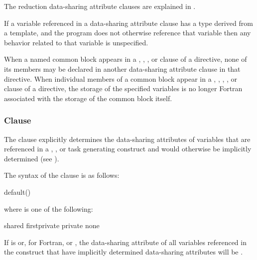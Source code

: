 The reduction data-sharing attribute clauses are explained in 
.

\begin{cppspecific}
If a variable referenced in a data-sharing attribute clause has a type derived from a
template, and the program does not otherwise reference that variable then any
behavior related to that variable is unspecified.
\end{cppspecific}

\begin{fortranspecific}
When a named common block appears in a , ,
, or  clause of a directive, none of its members 
may be declared in another data-sharing attribute clause in that directive. When 
individual members of a common block appear in a , ,
, , or  clause of a directive, the 
storage of the specified variables is no longer Fortran associated with the storage 
of the common block itself. 
\end{fortranspecific}



\subsubsection{ Clause}
\label{subsubsec:default clause}
\summary
The  clause explicitly determines the data-sharing attributes 
of variables that are referenced in a , , or task 
generating construct and would otherwise be implicitly determined (see
).

\syntax
The syntax of the  clause is as follows:

\begin{ompSyntax}
  default()
\end{ompSyntax}
where  is one of the following:

\begin{indentedcodelist}
  shared
  firstprivate
  private
  none
\end{indentedcodelist}

\descr
If  is  or, for Fortran,
 or , the data-sharing attribute of all
variables referenced in the construct that have implicitly determined
data-sharing attributes will be .

